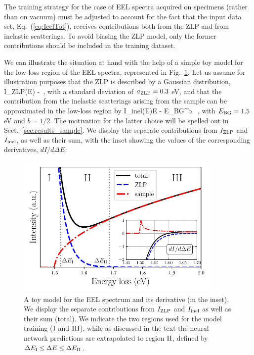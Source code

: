 The training strategy for the case of EEL spectra acquired on specimens (rather than on vacuum) must be adjusted
to account for the fact that the input data set, Eq.~(\ref{eq:IeelTot}), receives contributions
both from the ZLP and from inelastic scatterings.
%
To avoid biasing the ZLP model, only the former contributions should be
included in the training dataset.

We can illustrate the situation at hand with the help of a simple toy model for the low-loss
region of the EEL spectra, represented in
Fig.~\ref{fig:EELS_toy}.
%
Let us assume for illustration purposes that the ZLP is described by a Gaussian distribution,
\be
I_{\rm ZLP}(\Delta E) \propto  \exp \lp -\rp \, ,
\ee
with a standard deviation of $\sigma_{\rm ZLP}=0.3$ eV,
and that the contribution from the
inelastic scatterings arising from the sample can be approximated in the low-loss
region by
\be
I_{\rm inel}(\Delta E)\propto \lp \Delta E - E_{\rm BG}\rp^b \, ,
\ee
with $E_{\rm BG}=1.5$ eV and $b=1/2$.
%
The motivation for the latter
choice will be spelled out in Sect.~\ref{sec:results_sample}.
%
We display the separate contributions from $I_{\rm ZLP}$
and $I_{\rm inel}$, as well as their sum, 
with the inset showing the values of the corresponding derivatives, $dI/d\Delta E$.

\begin{figure}[t]
    \centering
    \includegraphics[width=0.89\textwidth]{plots/EELS_toy.pdf}
    \caption{A toy model for the EEL spectrum and its
      derivative (in the inset).
      We display the separate contributions from $I_{\rm ZLP}$
      and $I_{\rm inel}$ as well as their sum (total).
      We indicate the two regions used for the model training ($\rm I$ and $\rm III$),
      while as discussed in the text the neural network predictions
      are
      extrapolated to region $\rm II$, defined by $\Delta E_{\rm I} \le \Delta E \le \Delta E_{\rm II}$.
    }
    \label{fig:EELS_toy}
\end{figure}

